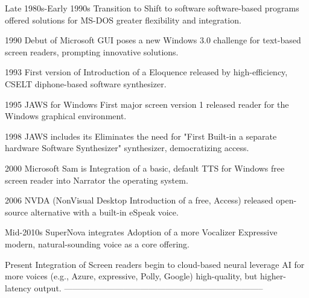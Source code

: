  Late 1980s-Early 1990s  Transition to           Shift to software
                          software-based          programs offered
                          solutions for MS-DOS    greater flexibility and
                                                  integration.

  1990                    Debut of Microsoft      GUI poses a new
                          Windows 3.0             challenge for
                                                  text-based screen
                                                  readers, prompting
                                                  innovative solutions.

  1993                    First version of        Introduction of a
                          Eloquence released by   high-efficiency,
                          CSELT                   diphone-based software
                                                  synthesizer.

  1995                    JAWS for Windows        First major screen
                          version 1 released      reader for the Windows
                                                  graphical environment.

  1998                    JAWS includes its       Eliminates the need for
                          "First Built-in        a separate hardware
                          Software Synthesizer"  synthesizer,
                                                  democratizing access.

  2000                    Microsoft Sam is        Integration of a basic,
                          default TTS for Windows free screen reader into
                          Narrator                the operating system.

  2006                    NVDA (NonVisual Desktop Introduction of a free,
                          Access) released        open-source alternative
                                                  with a built-in eSpeak
                                                  voice.

  Mid-2010s               SuperNova integrates    Adoption of a more
                          Vocalizer Expressive    modern,
                                                  natural-sounding voice
                                                  as a core offering.

  Present                 Integration of          Screen readers begin to
                          cloud-based neural      leverage AI for more
                          voices (e.g., Azure,    expressive,
                          Polly, Google)          high-quality, but
                                                  higher-latency output.
  -----------------------------------------------------------------------

